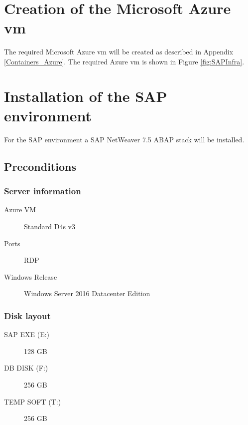 \label{SAPConfig}
\section{Creation of the Microsoft Azure \acrshort{vm}}
The required Microsoft Azure \acrshort{vm} will be created as described in Appendix \ref{Containers_Azure}. 
The required Azure \acrshort{vm} is shown in Figure \ref{fig:SAPInfra}.

\section{Installation of the SAP environment}
For the SAP environment a SAP NetWeaver 7.5 ABAP stack will be installed. 

\subsection{Preconditions}
\subsubsection{Server information}
\begin{description}
    \item[Azure VM] Standard D4s v3
    \item[Ports] RDP
    \item[Windows Release] Windows Server 2016 Datacenter Edition
\end{description}   

\subsubsection{Disk layout}
\begin{description}
    \item[SAP EXE (E:)] 128 GB
    \item[DB DISK (F:)] 256 GB
    \item[TEMP SOFT (T:)] 256 GB
\end{description}

